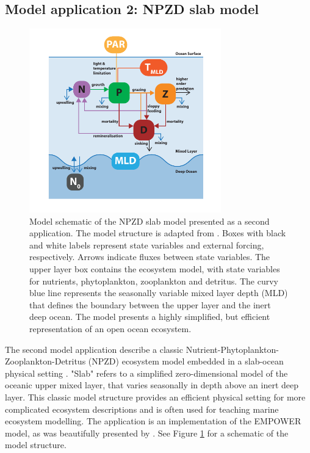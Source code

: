 \documentclass[journal abbreviation, manuscript]{copernicus}
\begin{document}
\subsection{Model application 2: NPZD slab model}
\begin{figure}[t]
\includegraphics[width=8.3cm]{Figures/firstdraft_schematics/02_schematics_EMPOWER.pdf}
\caption{Model schematic of the NPZD slab model presented as a second application. The model structure is adapted
from \citet{Anderson2015c}. Boxes with black and white labels represent state variables and external forcing, respectively. Arrows indicate fluxes between state variables. The upper layer box contains the ecosystem model, with state variables for nutrients, phytoplankton, zooplankton and detritus. The curvy blue line represents the seasonally variable mixed layer depth (MLD) that defines the boundary between the upper layer and the inert deep ocean. The model presents a highly simplified, but efficient representation of an open ocean ecosystem.}
\label{Figure:ModelSchematics_2}
\end{figure}

The second model application describe a classic Nutrient-Phytoplankton-Zooplankton-Detritus (NPZD) ecosystem model embedded in a slab-ocean physical setting \citep[e.g.,][]{Evans1985ACycles, Fasham1990a}. "Slab" refers to a simplified zero-dimensional model of the oceanic upper mixed layer, that varies seasonally in depth above an inert deep layer. This classic model structure provides an efficient physical setting for more complicated ecosystem descriptions and is often used for teaching marine ecosystem modelling. The application is an implementation of the EMPOWER model, as was beautifully presented by \citet{Anderson2015c}. See Figure \ref{Figure:ModelSchematics_2} for a schematic of the model structure.
\end{document}
